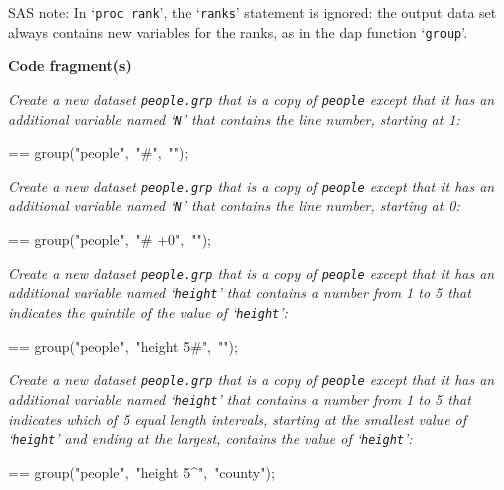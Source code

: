 \documentclass{book}
\makeatletter
\newenvironment{Texinfopreformatted}{%
  \par\GNUTobeylines\obeyspaces\frenchspacing\parskip=\z@\parindent=\z@}{}
{\catcode`\^^M=13 \gdef\GNUTobeylines{\catcode`\^^M=13 \def^^M{\null\par}}}
\newenvironment{Texinfoindented}{\begin{list}{}{}\item\relax}{\end{list}}
\renewcommand{\_}{\Texinfounderscore\discretionary{}{}{}}
\makeatother
\begin{document}
SAS note: In `\texttt{proc rank}', the `\texttt{ranks}' statement is ignored: the output data
set always contains new variables for the ranks, as in
the dap function `\texttt{group}'.

\noindent{}\textbf{Code fragment(s)}

\emph{Create a new dataset \texttt{people.grp} that is a copy of
\texttt{people} except that it has an additional variable named
`\texttt{\_N\_}' that contains the line number, starting at 1:}
\begin{Texinfoindented}
\begin{Texinfopreformatted}%
\ttfamily group("people",\ "\#",\ "");
\end{Texinfopreformatted}
\end{Texinfoindented}

\emph{Create a new dataset \texttt{people.grp} that is a copy of
\texttt{people} except that it has an additional variable named
`\texttt{\_N\_}' that contains the line number, starting at 0:}
\begin{Texinfoindented}
\begin{Texinfopreformatted}%
\ttfamily group("people",\ "\# +0",\ "");
\end{Texinfopreformatted}
\end{Texinfoindented}

\emph{Create a new dataset \texttt{people.grp} that is a copy of
\texttt{people} except that it has an additional variable named
`\texttt{\_height}' that contains a number from 1 to 5 that indicates
the quintile of the value of `\texttt{height}':}
\begin{Texinfoindented}
\begin{Texinfopreformatted}%
\ttfamily group("people",\ "height 5\#",\ "");
\end{Texinfopreformatted}
\end{Texinfoindented}

\emph{Create a new dataset \texttt{people.grp} that is a copy of
\texttt{people} except that it has an additional variable named
`\texttt{\_height}' that contains a number from 1 to 5 that indicates
which of 5 equal length intervals, starting at the smallest value
of `\texttt{height}' and ending at the largest,
contains the value of `\texttt{height}':}
\begin{Texinfoindented}
\begin{Texinfopreformatted}%
\ttfamily group("people",\ "height 5\^{}",\ "county");
\end{Texinfopreformatted}
\end{Texinfoindented}
\end{document}
